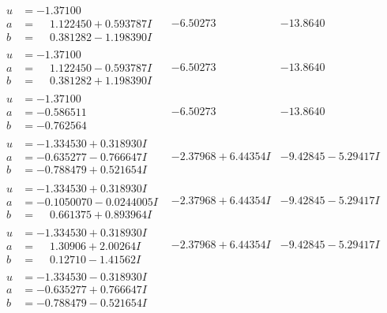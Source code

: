 \documentclass[1p]{elsarticle_modified}
\theoremstyle{definition}
\begin{document}
$$\begin{array}{c|c|c}
\begin{aligned}
u &= -1.37100\phantom{ +0.000000I} \\
a &= \phantom{-}1.122450 + 0.593787 I \\
b &= \phantom{-}0.381282 - 1.198390 I\end{aligned}
 & -6.50273\phantom{ +0.000000I} & -13.8640\phantom{ +0.000000I} \\ \hline\begin{aligned}
u &= -1.37100\phantom{ +0.000000I} \\
a &= \phantom{-}1.122450 - 0.593787 I \\
b &= \phantom{-}0.381282 + 1.198390 I\end{aligned}
 & -6.50273\phantom{ +0.000000I} & -13.8640\phantom{ +0.000000I} \\ \hline\begin{aligned}
u &= -1.37100\phantom{ +0.000000I} \\
a &= -0.586511\phantom{ +0.000000I} \\
b &= -0.762564\phantom{ +0.000000I}\end{aligned}
 & -6.50273\phantom{ +0.000000I} & -13.8640\phantom{ +0.000000I} \\ \hline\begin{aligned}
u &= -1.334530 + 0.318930 I \\
a &= -0.635277 - 0.766647 I \\
b &= -0.788479 + 0.521654 I\end{aligned}
 & -2.37968 + 6.44354 I & -9.42845 - 5.29417 I \\ \hline\begin{aligned}
u &= -1.334530 + 0.318930 I \\
a &= -0.1050070 - 0.0244005 I \\
b &= \phantom{-}0.661375 + 0.893964 I\end{aligned}
 & -2.37968 + 6.44354 I & -9.42845 - 5.29417 I \\ \hline\begin{aligned}
u &= -1.334530 + 0.318930 I \\
a &= \phantom{-}1.30906 + 2.00264 I \\
b &= \phantom{-}0.12710 - 1.41562 I\end{aligned}
 & -2.37968 + 6.44354 I & -9.42845 - 5.29417 I \\ \hline\begin{aligned}
u &= -1.334530 - 0.318930 I \\
a &= -0.635277 + 0.766647 I \\
b &= -0.788479 - 0.521654 I\end{aligned}

\end{array}$$
\end{document}
